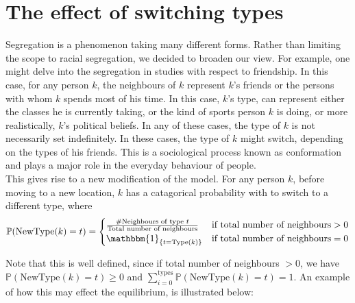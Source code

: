 \section{The effect of switching types}
\label{section:switch}
Segregation is a phenomenon taking many different forms. Rather than  limiting the scope to racial segregation, we decided to broaden our view. 
For example, one might delve into the segregation in studies with respect to friendship. 
In this case, for any person \(k\), the neighbours of \(k\) represent \(k\)'s friends or the persons with whom \(k\) spends most of his time.
In this case, \(k\)'s type, can represent either the classes he is currently taking, or the kind of sports person \(k\) is doing, or more realistically, \(k\)'s political beliefs.
In any of these cases, the type of \(k\) is not necessarily set indefinitely.
In these cases, the type of \(k\) might switch, depending on the types of his friends. This is a sociological process known as conformation and plays a major role in the everyday behaviour of people.\\

This gives rise to a new modification of the model.
For any person \(k\), before moving to a new location, \(k\) has a catagorical probability with to switch to a different type, where 
\[\mathbb{P}(\text{NewType}(k)=t) = \begin{cases} 
 \frac{\#\text{Neighbours of type }t}{\text{Total number of neighbours}}	&\mbox{if } \text{total number of neighbours}>0 \\ 
\mathbbm{1}_{\{t=\text{Type}(k)\}}   &\mbox{if } \text{total number of neighbours}=0
\end{cases}\]

Note that this is well defined, since if total number of neighbours \(> 0\), we have \( \mathbb{P}(\text{NewType}(k)=t) \geq 0\) and \(\sum_{i=0}^{\text{types}}\mathbb{P}(\text{NewType}(k)=t)=1\). 
An example of how this may effect the equilibrium, is illustrated below:

